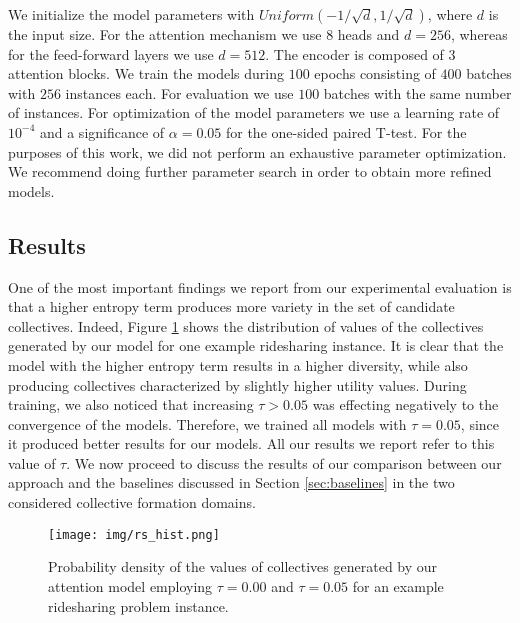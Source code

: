 \documentclass{article}
\theoremstyle{definition}
\begin{document}
We initialize the model parameters with $Uniform(-1/\sqrt{d}, 1/\sqrt{d})$, where $d$ is the input size. For the attention mechanism we use $8$ heads and $d = 256$, whereas for the feed-forward layers we use $d = 512$. The encoder is composed of $3$ attention blocks. We train the models during $100$ epochs consisting of $400$ batches with $256$ instances each. For evaluation we use $100$ batches with the same number of instances. For optimization of the model parameters we use a learning rate of $10^{-4}$ and a significance of $\alpha = 0.05$ for the one-sided paired T-test. For the purposes of this work, we did not perform an exhaustive parameter optimization. We recommend doing further parameter search in order to obtain more refined models.

\subsection{Results}

One of the most important findings we report from our experimental evaluation is that a higher entropy term produces more variety in the set of candidate collectives.
Indeed, Figure \ref{hist} shows the distribution of values of the collectives generated by our model for one example ridesharing instance.
It is clear that the model with the higher entropy term results in a higher diversity, while also producing collectives characterized by slightly higher utility values.
During training, we also noticed that increasing $\tau > 0.05$ was effecting negatively to the convergence of the models. Therefore, we trained all models with $\tau = 0.05$, since it produced better results for our models.
All our results we report refer to this value of $\tau$.
We now proceed to discuss the results of our comparison between our approach and the baselines discussed in Section \ref{sec:baselines} in the two considered collective formation domains.

\begin{figure}[t]
    \centering
    \texttt{[image: img/rs\_hist.png]}
    \caption{Probability density of the values of collectives generated by our attention model employing $\tau = 0.00$ and $\tau = 0.05$ for an example ridesharing problem instance.}
    \label{hist}
\end{figure}

\end{document}
